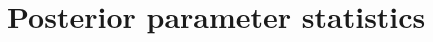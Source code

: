 \documentclass[AMA,STIX1COL]{WileyNJD-v2}
\begin{document}

\appendix

\section{Posterior parameter statistics \label{app1}}




\end{document}
